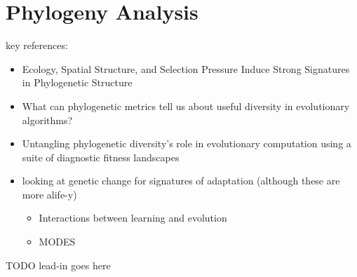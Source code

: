 \section{Phylogeny Analysis}
\label{sec:phylogeny-analysis}

key references:
\begin{itemize}
  \item Ecology, Spatial Structure, and Selection Pressure Induce Strong Signatures in Phylogenetic Structure \citep{moreno2024ecology}
  \item What can phylogenetic metrics tell us about useful diversity in evolutionary algorithms? \citep{hernandez2022can}
  \item Untangling phylogenetic diversity's role in evolutionary computation using a suite of diagnostic fitness landscapes \citep{shahbandegan2022untangling}
  \item looking at genetic change for signatures of adaptation (although these are more alife-y)
  \begin{itemize}
    \item Interactions between learning and evolution \citep{ackley1991interactions}
    \item MODES \citep{dolson2019modes}
  \end{itemize}
\end{itemize}

TODO lead-in goes here


